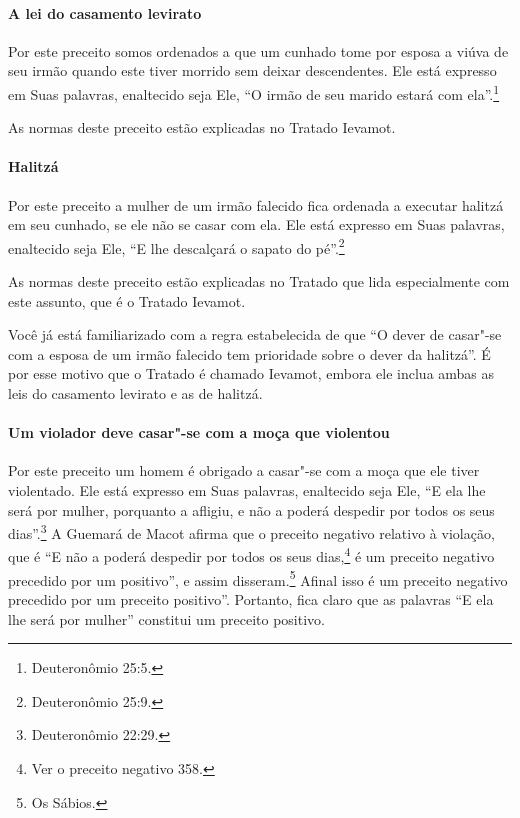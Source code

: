 \begin{multicols}{2}
\paragraph{A lei do casamento levirato\starr{}}

Por este preceito somos ordenados a que um cunhado tome por esposa a
viúva de seu irmão quando este tiver morrido sem deixar descendentes.
Ele está expresso em Suas palavras, enaltecido seja Ele, ``O irmão de
seu marido estará com ela''.\footnote{Deuteronômio 25:5.}

As normas deste preceito estão explicadas no Tratado Ievamot\starr.

\paragraph{Halitzá\starr}

Por este preceito a mulher de um irmão falecido fica ordenada a
executar halitzá\starr{} em seu cunhado, se ele não se casar com ela. Ele
está expresso em Suas palavras, enaltecido seja Ele, ``E lhe descalçará
o sapato do pé''.\footnote{Deuteronômio 25:9.}

As normas deste preceito estão explicadas no Tratado que lida
especialmente com este assunto, que é o Tratado Ievamot\starr.

Você já está familiarizado com a regra estabelecida de que ``O dever de
casar"-se com a esposa de um irmão falecido tem prioridade sobre o dever
da halitzá\starr''. É por esse motivo que o Tratado é chamado Ievamot\starr,
embora ele inclua ambas as leis do casamento levirato\starr{} e as de
halitzá\starr.

\paragraph{Um violador deve casar"-se com a moça que violentou}

Por este preceito um homem é obrigado a casar"-se com a moça que ele
tiver violentado. Ele está expresso em Suas palavras, enaltecido seja
Ele, ``E ela lhe será por mulher, porquanto a afligiu, e não a poderá
despedir por todos os seus dias''.\footnote{Deuteronômio 22:29.} A Guemará\starr{} de
Macot\starr{} afirma que o preceito negativo relativo à violação, que é ``E não
a poderá despedir por todos os seus dias,\footnote{Ver o preceito negativo 358.} é um preceito negativo precedido por um positivo'', e assim
disseram.\footnote{Os Sábios.} Afinal isso é um preceito negativo
precedido por um preceito positivo''. Portanto, fica claro que as palavras ``E ela lhe será por mulher'' constitui um preceito positivo.


\end{multicols}
